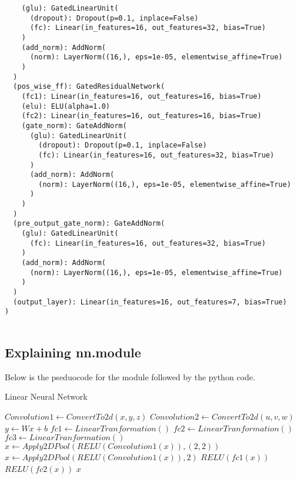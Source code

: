 \documentclass{article}
\begin{document}
\begin{lstlisting}
    (glu): GatedLinearUnit(
      (dropout): Dropout(p=0.1, inplace=False)
      (fc): Linear(in_features=16, out_features=32, bias=True)
    )
    (add_norm): AddNorm(
      (norm): LayerNorm((16,), eps=1e-05, elementwise_affine=True)
    )
  )
  (pos_wise_ff): GatedResidualNetwork(
    (fc1): Linear(in_features=16, out_features=16, bias=True)
    (elu): ELU(alpha=1.0)
    (fc2): Linear(in_features=16, out_features=16, bias=True)
    (gate_norm): GateAddNorm(
      (glu): GatedLinearUnit(
        (dropout): Dropout(p=0.1, inplace=False)
        (fc): Linear(in_features=16, out_features=32, bias=True)
      )
      (add_norm): AddNorm(
        (norm): LayerNorm((16,), eps=1e-05, elementwise_affine=True)
      )
    )
  )
  (pre_output_gate_norm): GateAddNorm(
    (glu): GatedLinearUnit(
      (fc): Linear(in_features=16, out_features=32, bias=True)
    )
    (add_norm): AddNorm(
      (norm): LayerNorm((16,), eps=1e-05, elementwise_affine=True)
    )
  )
  (output_layer): Linear(in_features=16, out_features=7, bias=True)
)


\end{lstlisting}




\subsection{Explaining nn.module}
Below is the pseduocode for the module followed by the python code.
\begin{algorithm}
\caption{Linear Neural Network}
\begin{algorithmic}[1]
\STATE $Convolution1 \leftarrow ConvertTo2d(x,y,z)$
\STATE $Convolution2 \leftarrow ConvertTo2d(u,v,w)$
\STATE $y \leftarrow Wx + b$
\STATE $fc1 \leftarrow LinearTranformation()$ 
\STATE $fc2 \leftarrow LinearTranformation()$
\STATE $fc3 \leftarrow LinearTranformation()$
\STATE $x \leftarrow Apply2DPool(RELU(Convolution1(x)), (2, 2))$
\STATE $x \leftarrow Apply2DPool(RELU(Convolution1(x)),2 )$
\STATE $RELU(fc1(x))$
\STATE $RELU(fc2(x))$
\RETURN $x$
\end{algorithmic}
\end{algorithm}
\end{document}
